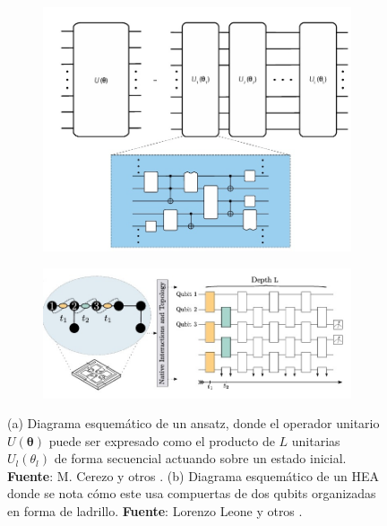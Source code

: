 \documentclass[letterpaper,12pt]{thesisECFM}
\theoremstyle{plain}
\theoremstyle{definition}
\theoremstyle{definition}
\theoremstyle{remark}
\newcommand{\1}{\mathbb{1}}
\begin{document}
\begin{figure}[h!]  
    \begin{subfigure}[b]{0.47\linewidth}
        \includegraphics[width=\linewidth]{imagenes/ansatz_esquema.jpg}
        \caption{}
        \label{fig:ansatz_general}
    \end{subfigure}
    \hfill
    \begin{subfigure}[b]{0.55\linewidth}
        \includegraphics[width=\linewidth]{imagenes/HEA_ansatz.jpg}
        \caption{}
        \label{fig:HEA_ansatz}
    \end{subfigure}
    \caption{(a) Diagrama esquemático de un ansatz, donde el operador unitario $U(\bm{\theta})$ puede ser expresado como el producto de $L$ unitarias $U_l(\theta_l)$ de forma secuencial actuando sobre un estado inicial. \textbf{Fuente}: M. Cerezo y otros \cite{VQA}. (b) Diagrama esquemático de un HEA donde se nota cómo este usa compuertas de dos qubits organizadas en forma de ladrillo. \textbf{Fuente}: Lorenzo Leone y otros \cite{HEA}.}
    \label{fig:ansatz_comparacion}
\end{figure}
\end{document}
